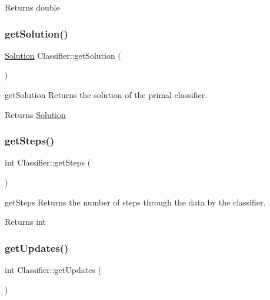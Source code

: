 \begin{DoxyReturn}{Returns}
double 
\end{DoxyReturn}
\mbox{\label{class_classifier_afd2b54ada10af9f4be1c4d326b180dc7}} 
\subsubsection{\texorpdfstring{get\+Solution()}{getSolution()}}
{\footnotesize\ttfamily \hyperlink{class_solution}{Solution} Classifier\+::get\+Solution (\begin{DoxyParamCaption}{ }\end{DoxyParamCaption})}



get\+Solution Returns the solution of the primal classifier. 

\begin{DoxyReturn}{Returns}
\hyperlink{class_solution}{Solution} 
\end{DoxyReturn}
\mbox{\label{class_classifier_a1fb3e4dfd80c154e89603c8fa1b11b76}} 
\subsubsection{\texorpdfstring{get\+Steps()}{getSteps()}}
{\footnotesize\ttfamily int Classifier\+::get\+Steps (\begin{DoxyParamCaption}{ }\end{DoxyParamCaption})\hspace{0.3cm}{\ttfamily [inline]}}



get\+Steps Returns the number of steps through the data by the classifier. 

\begin{DoxyReturn}{Returns}
int 
\end{DoxyReturn}
\mbox{\label{class_classifier_a738c2fbed982db6cad02062edcc037e4}} 
\subsubsection{\texorpdfstring{get\+Updates()}{getUpdates()}}
{\footnotesize\ttfamily int Classifier\+::get\+Updates (\begin{DoxyParamCaption}{ }\end{DoxyParamCaption})\hspace{0.3cm}{\ttfamily [inline]}}



